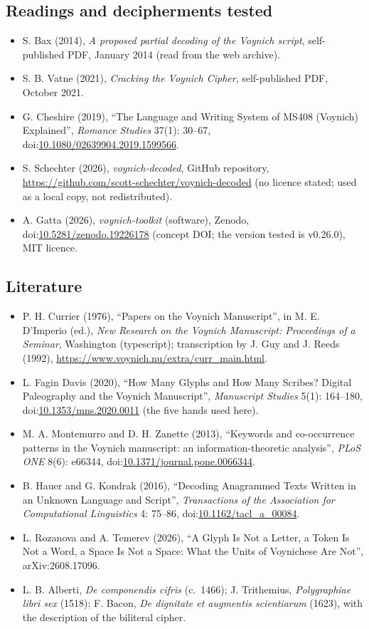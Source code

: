\subsection{Readings and decipherments tested}
\begin{itemize}
\item S. Bax (2014), \emph{A proposed partial decoding of the Voynich script}, self-published PDF, January 2014 (read from
  the web archive).
\item S. B. Vatne (2021), \emph{Cracking the Voynich Cipher}, self-published PDF, October 2021.
\item G. Cheshire (2019), ``The Language and Writing System of MS408 (Voynich) Explained'', \emph{Romance Studies} 37(1):
  30--67, doi:\url{10.1080/02639904.2019.1599566}.
\item S. Schechter (2026), \emph{voynich-decoded}, GitHub repository,
  \url{https://github.com/scott-schechter/voynich-decoded} (no licence stated; used as a local copy, not redistributed).
\item A. Gatta (2026), \emph{voynich-toolkit} (software), Zenodo, doi:\url{10.5281/zenodo.19226178} (concept DOI; the version
  tested is v0.26.0), MIT licence.
\end{itemize}

\subsection{Literature}
\begin{itemize}
\item P. H. Currier (1976), ``Papers on the Voynich Manuscript'', in M. E. D'Imperio (ed.), \emph{New Research on the
  Voynich Manuscript: Proceedings of a Seminar}, Washington (typescript); transcription by J. Guy and J. Reeds (1992),
  \url{https://www.voynich.nu/extra/curr_main.html}.
\item L. Fagin Davis (2020), ``How Many Glyphs and How Many Scribes? Digital Paleography and the Voynich Manuscript'',
  \emph{Manuscript Studies} 5(1): 164--180, doi:\url{10.1353/mns.2020.0011} (the five hands used here).
\item M. A. Montemurro and D. H. Zanette (2013), ``Keywords and co-occurrence patterns in the Voynich manuscript: an
  information-theoretic analysis'', \emph{PLoS ONE} 8(6): e66344, doi:\url{10.1371/journal.pone.0066344}.
\item B. Hauer and G. Kondrak (2016), ``Decoding Anagrammed Texts Written in an Unknown Language and Script'',
  \emph{Transactions of the Association for Computational Linguistics} 4: 75--86, doi:\url{10.1162/tacl_a_00084}.
\item L. Rozanova and A. Temerev (2026), ``A Glyph Is Not a Letter, a Token Is Not a Word, a Space Is Not a Space: What
  the Units of Voynichese Are Not'', arXiv:2608.17096.
\item L. B. Alberti, \emph{De componendis cifris} (c.~1466); J. Trithemius, \emph{Polygraphiae libri sex} (1518); F.
  Bacon, \emph{De dignitate et augmentis scientiarum} (1623), with the description of the biliteral cipher.
\end{itemize}
